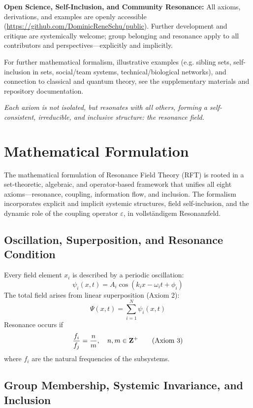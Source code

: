 \documentclass[12pt]{iopart}
\providecommand{\mathbb}[1]{\mathbf{#1}}
\providecommand{\text}[1]{\mbox{#1}}
\providecommand{\quad}{\hskip1em\relax}
\providecommand{\qquad}{\hskip2em\relax}
\begin{document}
\textbf{Open Science, Self-Inclusion, and Community Resonance:}  
All axioms, derivations, and examples are openly accessible (\url{https://github.com/DominicReneSchu/public}). Further development and critique are systemically welcome; group belonging and resonance apply to all contributors and perspectives—explicitly and implicitly.

\medskip

For further mathematical formalism, illustrative examples (e.g. sibling sets, self-inclusion in sets, social/team systems, technical/biological networks), and connection to classical and quantum theory, see the supplementary materials and repository documentation.

\medskip

\textit{Each axiom is not isolated, but resonates with all others, forming a self-consistent, irreducible, and inclusive structure: the resonance field.}
	
\section{Mathematical Formulation}

The mathematical formulation of Resonance Field Theory (RFT) is rooted in a set-theoretic, algebraic, and operator-based framework that unifies all eight axioms—resonance, coupling, information flow, and inclusion. The formalism incorporates explicit and implicit systemic structures, field self-inclusion, and the dynamic role of the coupling operator $\varepsilon$, in vollständigem Resonanzfeld.

\subsection{Oscillation, Superposition, and Resonance Condition}

Every field element $x_i$ is described by a periodic oscillation:
\[
\psi_i(x, t) = A_i \cos(k_i x - \omega_i t + \phi_i)
\]
The total field arises from linear superposition (Axiom 2):
\[
\Psi(x, t) = \sum_{i=1}^N \psi_i(x, t)
\]
Resonance occurs if
\[
\frac{f_i}{f_j} = \frac{n}{m}, \quad n, m \in \mathbb{Z}^+ \qquad \text{(Axiom 3)}
\]
where $f_i$ are the natural frequencies of the subsystems.

\subsection{Group Membership, Systemic Invariance, and Inclusion}
\end{document}
